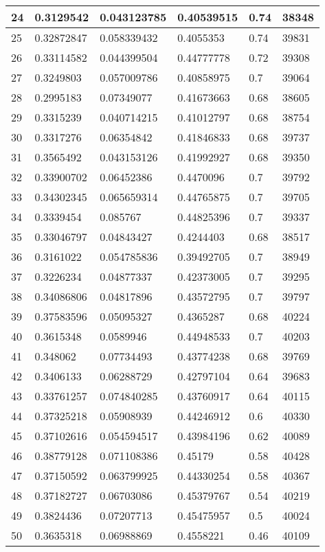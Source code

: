 \begin{longtable}{|l|l|l|l|l|l|}
24 & 0.3129542 & 0.043123785 & 0.40539515 & 0.74 & 38348 \\ \hline 
25 & 0.32872847 & 0.058339432 & 0.4055353 & 0.74 & 39831 \\ \hline 
26 & 0.33114582 & 0.044399504 & 0.44777778 & 0.72 & 39308 \\ \hline 
27 & 0.3249803 & 0.057009786 & 0.40858975 & 0.7 & 39064 \\ \hline 
28 & 0.2995183 & 0.07349077 & 0.41673663 & 0.68 & 38605 \\ \hline 
29 & 0.3315239 & 0.040714215 & 0.41012797 & 0.68 & 38754 \\ \hline 
30 & 0.3317276 & 0.06354842 & 0.41846833 & 0.68 & 39737 \\ \hline 
31 & 0.3565492 & 0.043153126 & 0.41992927 & 0.68 & 39350 \\ \hline 
32 & 0.33900702 & 0.06452386 & 0.4470096 & 0.7 & 39792 \\ \hline 
33 & 0.34302345 & 0.065659314 & 0.44765875 & 0.7 & 39705 \\ \hline 
34 & 0.3339454 & 0.085767 & 0.44825396 & 0.7 & 39337 \\ \hline 
35 & 0.33046797 & 0.04843427 & 0.4244403 & 0.68 & 38517 \\ \hline 
36 & 0.3161022 & 0.054785836 & 0.39492705 & 0.7 & 38949 \\ \hline 
37 & 0.3226234 & 0.04877337 & 0.42373005 & 0.7 & 39295 \\ \hline 
38 & 0.34086806 & 0.04817896 & 0.43572795 & 0.7 & 39797 \\ \hline 
39 & 0.37583596 & 0.05095327 & 0.4365287 & 0.68 & 40224 \\ \hline 
40 & 0.3615348 & 0.0589946 & 0.44948533 & 0.7 & 40203 \\ \hline 
41 & 0.348062 & 0.07734493 & 0.43774238 & 0.68 & 39769 \\ \hline 
42 & 0.3406133 & 0.06288729 & 0.42797104 & 0.64 & 39683 \\ \hline 
43 & 0.33761257 & 0.074840285 & 0.43760917 & 0.64 & 40115 \\ \hline 
44 & 0.37325218 & 0.05908939 & 0.44246912 & 0.6 & 40330 \\ \hline 
45 & 0.37102616 & 0.054594517 & 0.43984196 & 0.62 & 40089 \\ \hline 
46 & 0.38779128 & 0.071108386 & 0.45179 & 0.58 & 40428 \\ \hline 
47 & 0.37150592 & 0.063799925 & 0.44330254 & 0.58 & 40367 \\ \hline 
48 & 0.37182727 & 0.06703086 & 0.45379767 & 0.54 & 40219 \\ \hline 
49 & 0.3824436 & 0.07207713 & 0.45475957 & 0.5 & 40024 \\ \hline 
50 & 0.3635318 & 0.06988869 & 0.4558221 & 0.46 & 40109 \\ \hline 
\end{longtable}
